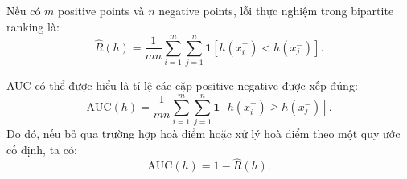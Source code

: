 Nếu có \(m\) positive points và \(n\) negative points, lỗi thực nghiệm trong bipartite ranking là:
\begin{equation}
    \widehat{R}(h)
    =
    \frac{1}{mn}
    \sum_{i=1}^{m}
    \sum_{j=1}^{n}
    \mathbf{1}
    \left[
        h(x^{+}_i)<h(x^{-}_j)
    \right].
    \label{eq:bipartite-empirical-error}
\end{equation}

AUC có thể được hiểu là tỉ lệ các cặp positive-negative được xếp đúng:
\begin{equation}
    \mathrm{AUC}(h)
    =
    \frac{1}{mn}
    \sum_{i=1}^{m}
    \sum_{j=1}^{n}
    \mathbf{1}
    \left[
        h(x^{+}_i)\geq h(x^{-}_j)
    \right].
    \label{eq:auc-definition}
\end{equation}
Do đó, nếu bỏ qua trường hợp hoà điểm hoặc xử lý hoà điểm theo một quy ước cố định, ta có:
\begin{equation}
    \mathrm{AUC}(h)=1-\widehat{R}(h).
    \label{eq:auc-error-relation}
\end{equation}